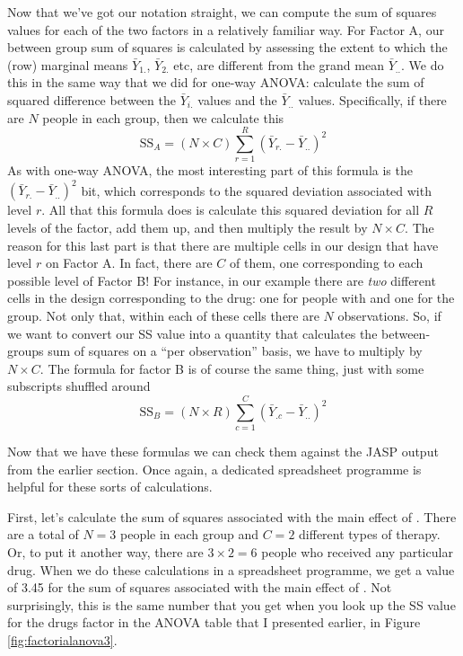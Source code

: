 \vspace{0.5cm}
\begin{mdframed}[style=MyFrame,nobreak=false]
Now that we've got our notation straight, we can compute the sum of squares values for each of the two factors in a relatively familiar way. For Factor A, our between group sum of squares is calculated by assessing the extent to which the (row) marginal means $\bar{Y}_{1.}$, $\bar{Y}_{2.}$ etc, are different from the grand mean $\bar{Y}_{..}$. We do this in the same way that we did for one-way ANOVA: calculate the sum of squared difference between the $\bar{Y}_{i.}$ values and the $\bar{Y}_{..}$ values. Specifically, if there are $N$ people in each group, then we calculate this
$$
\mbox{SS}_{A} = (N \times C)  \sum_{r=1}^R  \left( \bar{Y}_{r.} - \bar{Y}_{..} \right)^2
$$
As with one-way ANOVA, the most interesting part of this formula is the $\left( \bar{Y}_{r.} - \bar{Y}_{..} \right)^2$ bit, which corresponds to the squared deviation associated with level $r$. All that this formula does is calculate this squared deviation for all $R$ levels of the factor, add them up, and then multiply the result by $N \times C$. The reason for this last part is that there are multiple cells in our design that have level $r$ on Factor A. In fact, there are $C$ of them, one corresponding to each possible level of Factor B! For instance, in our example there are {\it two} different cells in the design corresponding to the  drug: one for people with  and one for the  group. Not only that, within each of these cells there are $N$ observations. So, if we want to convert our SS value into a quantity that calculates the between-groups sum of squares on a ``per observation'' basis, we have to multiply by $N \times C$. The formula for factor B is of course the same thing, just with some subscripts shuffled around
$$
\mbox{SS}_{B} = (N \times R) \sum_{c=1}^C \left( \bar{Y}_{.c} - \bar{Y}_{..} \right)^2
$$

Now that we have these formulas we can check them against the JASP output from the earlier section. Once again, a dedicated spreadsheet programme is helpful for these sorts of calculations.

First, let's calculate the sum of squares associated with the main effect of . There are a total of $N=3$ people in each group and $C=2$ different types of therapy. Or, to put it another way, there are $3 \times 2 = 6$ people who received any particular drug. When we do these calculations in a spreadsheet programme, we get a value of 3.45 for the sum of squares associated with the main effect of . Not surprisingly, this is the same number that you get when you look up the SS value for the drugs factor in the ANOVA table that I presented earlier, in Figure \ref{fig:factorialanova3}. 


\end{mdframed}
